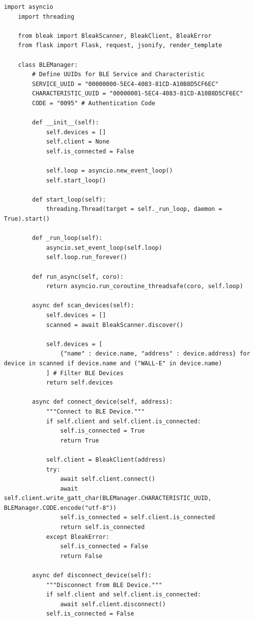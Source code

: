 \documentclass{article}
\begin{document}
\begin{lstlisting}[caption={Robot Driver App}, label={lst:driver_app_code}]
    import asyncio
    import threading

    from bleak import BleakScanner, BleakClient, BleakError
    from flask import Flask, request, jsonify, render_template

    class BLEManager:
        # Define UUIDs for BLE Service and Characteristic
        SERVICE_UUID = "00000000-5EC4-4083-81CD-A10B8D5CF6EC"
        CHARACTERISTIC_UUID = "00000001-5EC4-4083-81CD-A10B8D5CF6EC"
        CODE = "0095" # Authentication Code

        def __init__(self):
            self.devices = []
            self.client = None
            self.is_connected = False

            self.loop = asyncio.new_event_loop()
            self.start_loop()

        def start_loop(self):
            threading.Thread(target = self._run_loop, daemon = True).start()

        def _run_loop(self):
            asyncio.set_event_loop(self.loop)
            self.loop.run_forever()

        def run_async(self, coro):
            return asyncio.run_coroutine_threadsafe(coro, self.loop)

        async def scan_devices(self):
            self.devices = []
            scanned = await BleakScanner.discover()

            self.devices = [
                {"name" : device.name, "address" : device.address} for device in scanned if device.name and ("WALL-E" in device.name)
            ] # Filter BLE Devices
            return self.devices

        async def connect_device(self, address):
            """Connect to BLE Device."""
            if self.client and self.client.is_connected:
                self.is_connected = True
                return True

            self.client = BleakClient(address)
            try:
                await self.client.connect()
                await self.client.write_gatt_char(BLEManager.CHARACTERISTIC_UUID, BLEManager.CODE.encode("utf-8"))
                self.is_connected = self.client.is_connected
                return self.is_connected
            except BleakError:
                self.is_connected = False
                return False

        async def disconnect_device(self):
            """Disconnect from BLE Device."""
            if self.client and self.client.is_connected:
                await self.client.disconnect()
            self.is_connected = False


\end{lstlisting}
\end{document}

